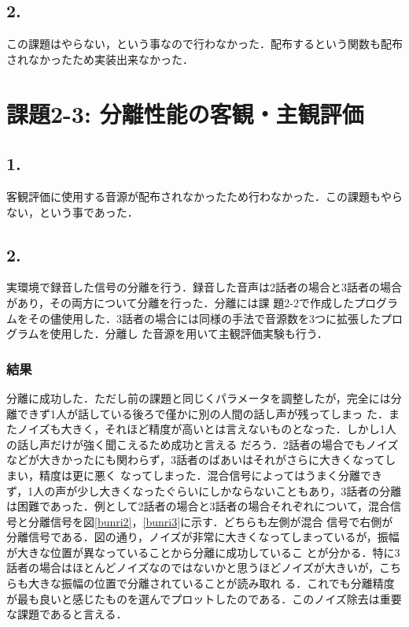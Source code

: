 \documentclass[a4j]{jarticle}
\begin{document}
\subsection{2.}
この課題はやらない，という事なので行わなかった．配布するという関数も配布されなかったため実装出来なかった．

\section{課題2-3: 分離性能の客観・主観評価}

\subsection{1.}
客観評価に使用する音源が配布されなかったため行わなかった．この課題もやらない，という事であった．

\subsection{2.}
実環境で録音した信号の分離を行う．録音した音声は2話者の場合と3話者の場合があり，その両方について分離を行った．分離には課
題2-2で作成したプログラムをその儘使用した．3話者の場合には同様の手法で音源数を3つに拡張したプログラムを使用した．分離し
た音源を用いて主観評価実験も行う．
\subsubsection{結果}
分離に成功した．ただし前の課題と同じくパラメータを調整したが，完全には分離できず1人が話している後ろで僅かに別の人間の話し声が残ってしまっ
た．またノイズも大きく，それほど精度が高いとは言えないものとなった．しかし1人の話し声だけが強く聞こえるため成功と言える
だろう．2話者の場合でもノイズなどが大きかったにも関わらず，3話者のばあいはそれがさらに大きくなってしまい，精度は更に悪く
なってしまった．混合信号によってはうまく分離できず，1人の声が少し大きくなったぐらいにしかならないこともあり，3話者の分離
は困難であった．例として2話者の場合と3話者の場合それぞれについて，混合信号と分離信号を図\ref{bunri2}，\ref{bunri3}に示す．どちらも左側が混合
信号で右側が分離信号である．図の通り，ノイズが非常に大きくなってしまっているが，振幅が大きな位置が異なっていることから分離に成功しているこ
とが分かる．特に3話者の場合はほとんどノイズなのではないかと思うほどノイズが大きいが，こちらも大きな振幅の位置で分離されていることが読み取れ
る．これでも分離精度が最も良いと感じたものを選んでプロットしたのである．このノイズ除去は重要な課題であると言える．
\end{document}

